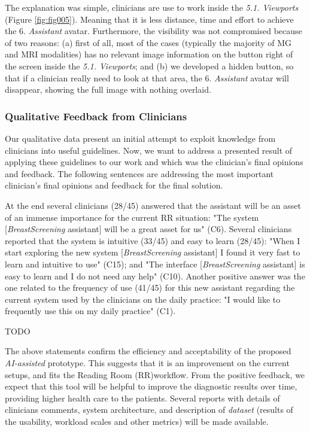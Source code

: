 The explanation was simple, clinicians are use to work inside the {\it 5.1. Viewports} (Figure \ref{fig:fig005}).
Meaning that it is less distance, time and effort to achieve the {6. \it Assistant} avatar.
Furthermore, the visibility was not compromised because of two reasons: (a) first of all, most of the cases (typically the majority of MG and MRI modalities) has no relevant image information on the button right of the screen inside the {\it 5.1. Viewports}; and (b) we developed a hidden button, so that if a clinician really need to look at that area, the {6. \it Assistant} avatar will disappear, showing the full image with nothing overlaid.

\subsubsection{Qualitative Feedback from Clinicians}

Our qualitative data present an initial attempt to exploit knowledge from clinicians into useful guidelines.
Now, we want to address a presented result of applying these guidelines to our work and which was the clinician's final opinions and feedback.
The following sentences are addressing the most important clinician's final opinions and feedback for the final solution.

At the end several clinicians (28/45) answered that the assistant will be an asset of an immense importance for the current RR situation:
"The system [{\it BreastScreening} assistant] will be a great asset for us" (C6).
Several clinicians reported that the system is intuitive (33/45) and easy to learn (28/45):
"When I start exploring the new system [{\it Breast\-Screening} assistant] I found it very fast to learn and intuitive to use" (C15); and
"The interface [{\it BreastScreening} assistant] is easy to learn and I do not need any help" (C10).
Another positive answer was the one related to the frequency of use (41/45) for this new assistant regarding the current system used by the clinicians on the daily practice:
"I would like to frequently use this on my daily practice" (C1).

TODO

The above statements confirm the efficiency and acceptability of the proposed {\it AI-assisted} prototype.
This suggests that it is an improvement on the current setups, and fits the Reading Room (RR)\footnotemark[19] workflow.
From the positive feedback, we expect that this tool will be helpful to improve the diagnostic results over time, providing higher health care to the patients.
Several reports with details of clinicians comments, system architecture, and description of {\it dataset} (results of the usability, workload scales and other metrics) will be made available.

